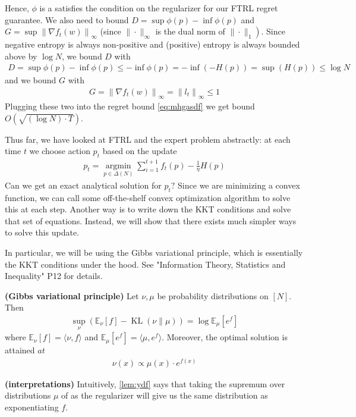 \documentclass{article}
\newcommand{\bfs}[1]{\textbf{({#1}) }}
\begin{document}
Hence, $\phi$ is a satisfies the condition on the regularizer for our FTRL regret guarantee. We also need to bound $D=\sup \phi(p)-\inf \phi(p)$ and $G=\sup \left\|\nabla f_{t}(w)\right\|_{\infty}$ (since $\|\cdot\|_{\infty}$ is the dual norm of $\left.\|\cdot\|_{1}\right)$. Since negative entropy is always non-positive and (positive) entropy is always bounded above by $\log N$, we bound $D$ with
\begin{align*}
D=\sup \phi(p)-\inf \phi(p) \leq-\inf \phi(p)=-\inf (-H(p))=\sup (H(p)) \leq \log N
\end{align*}
and we bound $G$ with
\begin{align*}
G=\left\|\nabla f_{t}(w)\right\|_{\infty}=\left\|l_{t}\right\|_{\infty} \leq 1
\end{align*}
Plugging these two into the regret bound \cref{eq:mhgasdf} we get bound $O(\sqrt{(\log N) \cdot T})$.


Thus far, we have looked at FTRL and the expert problem abstractly: at each time $t$ we choose action $p_{t}$ based on the update
\begin{align*}
p_{t}=\underset{p \in \Delta(N)}{\operatorname{argmin}} \sum_{i=1}^{t+1} f_{t}(p)-\frac{1}{\eta} H(p)
\end{align*}
Can we get an exact analytical solution for $p_{t} ?$ Since we are minimizing a convex function, we can call some off-the-shelf convex optimization algorithm to solve this at each step. Another way is to write down the KKT conditions and solve that set of equations. Instead, we will show that there exists much simpler ways to solve this update. 

In particular, we will be using the Gibbs variational principle, which is essentially the KKT conditions under the hood. See "Information Theory, Statistics and Inequality" P12 for details.
\begin{lema}\bfs{Gibbs variational principle}\label{lem:ydf}
  Let $\nu, \mu$ be probability distributions on $[N] .$ Then
\begin{align*}
\sup _{\nu}\left(\mathbb{E}_{\nu}[f]-\operatorname{KL}(\nu \| \mu)\right)=\log \mathbb{E}_{\mu}\left[e^{f}\right]
\end{align*}
where $\mathbb{E}_{\nu}[f]=\langle \nu, f\rangle$ and $\mathbb{E}_{\mu}\left[e^{f}\right]=\langle \mu, e^f\rangle$.  Moreover, the optimal solution is attained $a t$
\begin{align*}
\nu(x) \propto \mu(x) \cdot e^{f(x)}
\end{align*}
\end{lema} 
\begin{rema}\bfs{interpretations}
 Intuitively, \cref{lem:ydf} says that taking the supremum over distributions $\mu$ of   as the regularizer will give us the same distribution as exponentiating $f .$
\end{rema}
\end{document}
